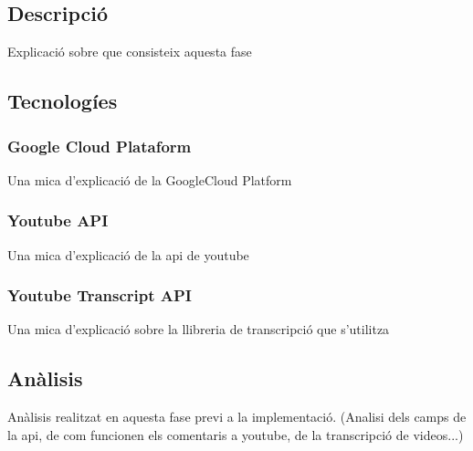 
\subsection{Descripció}
Explicació sobre que consisteix aquesta fase
\subsection{Tecnologíes}
\subsubsection{Google Cloud Plataform}
Una mica d'explicació de la GoogleCloud Platform
\subsubsection{Youtube API}
Una mica d'explicació de la api de youtube
\subsubsection{Youtube Transcript API}
Una mica d'explicació sobre la llibreria de transcripció que s'utilitza
\subsection{Anàlisis}
Anàlisis realitzat en aquesta fase previ a la implementació.
(Analisi dels camps de la api, de com funcionen els comentaris a youtube, de la transcripció de videos...)
